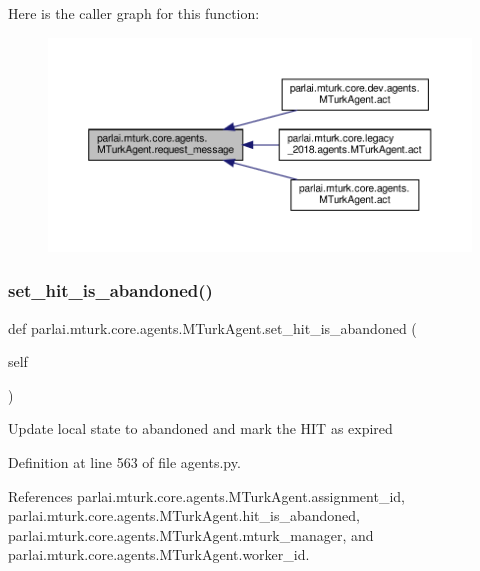 Here is the caller graph for this function\+:
\nopagebreak
\begin{figure}[H]
\begin{center}
\leavevmode
\includegraphics[width=350pt]{classparlai_1_1mturk_1_1core_1_1agents_1_1MTurkAgent_ade43480595cc2f6be96b5eb690e3128d_icgraph}
\end{center}
\end{figure}
\mbox{\label{classparlai_1_1mturk_1_1core_1_1agents_1_1MTurkAgent_a71115b83b70d4730c54e61837846d914}} 
\subsubsection{\texorpdfstring{set\+\_\+hit\+\_\+is\+\_\+abandoned()}{set\_hit\_is\_abandoned()}}
{\footnotesize\ttfamily def parlai.\+mturk.\+core.\+agents.\+M\+Turk\+Agent.\+set\+\_\+hit\+\_\+is\+\_\+abandoned (\begin{DoxyParamCaption}\item[{}]{self }\end{DoxyParamCaption})}

\begin{DoxyVerb}Update local state to abandoned and mark the HIT as expired\end{DoxyVerb}
 

Definition at line 563 of file agents.\+py.



References parlai.\+mturk.\+core.\+agents.\+M\+Turk\+Agent.\+assignment\+\_\+id, parlai.\+mturk.\+core.\+agents.\+M\+Turk\+Agent.\+hit\+\_\+is\+\_\+abandoned, parlai.\+mturk.\+core.\+agents.\+M\+Turk\+Agent.\+mturk\+\_\+manager, and parlai.\+mturk.\+core.\+agents.\+M\+Turk\+Agent.\+worker\+\_\+id.




